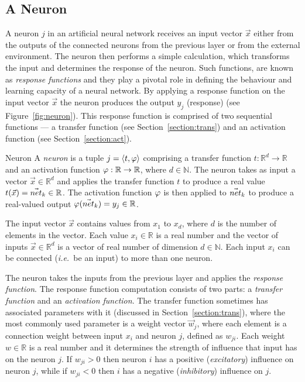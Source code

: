 \subsection{A Neuron}
A neuron $j$ in an artificial neural network receives an input vector $\vec{x}$ either from the outputs of the connected neurons from the previous layer or from the external environment. The neuron then performs a simple calculation, which transforms the input and determines the response of the neuron. Such functions, are known as \textit{response functions} and they play a pivotal role in defining the behaviour and learning capacity of a neural network. By applying a response function on the input vector $\vec{x}$ the neuron produces the output $y_j$ (response) (see Figure~\ref{fig:neuron}). This response function is comprised of two sequential functions --- a transfer function (see Section~\ref{section:trans}) and an activation function (see Section~\ref{section:act}).


\begin{Definition}{Neuron}{}
A \emph{neuron} is a tuple $j = \langle t, \varphi\rangle$ comprising a transfer function $t:\mathbb{R}^d \to \mathbb{R}$ and an activation function $\varphi:\mathbb{R}\to \mathbb{R}$, where $d \in \mathbb{N}$. The neuron takes as input a vector $\vec{x}\in \mathbb{R}^d$ and applies the transfer function $t$ to produce a real value $t(\vec{x})=\vec{net}_{k}\in \mathbb{R}$. The activation function $\varphi$ is then applied to $\vec{net}_{k}$ to produce a real-valued output $\varphi(\vec{net}_{k})=y_j\in \mathbb{R}$.
\end{Definition}


The input vector $\vec{x}$ contains values from $x_1$ to $x_d$, where $d$ is the number of elements in the vector. Each value $x_i\in \mathbb{R}$ is a real number and the vector of inputs $\vec{x}\in \mathbb{R}^d$ is a vector of real number of dimension $d\in \mathbb{N}$. Each input $x_i$ can be connected (\textit{i.e.\ }be an input) to more than one neuron. 

The neuron takes the inputs from the previous layer and applies the \textit{response function}. The response function computation consists of two parts: a \textit{transfer function} and an \textit{activation function}. The transfer function sometimes has associated parameters with it (discussed in Section~\ref{section:trans}), where the most commonly used parameter is a weight vector $\vec{w}_{j}$, where each element is a connection weight between input $x_i$ and neuron $j$, defined as $w_{ji}$. Each weight $w \in \mathbb{R}$ is a real number and it determines the strength of influence that input has on the neuron $j$. If $w_{ji}>0$ then neuron $i$ has a positive (\emph{excitatory}) influence on neuron $j$, while if $w_{ji}<0$ then $i$ has a negative (\emph{inhibitory}) influence on $j$.

